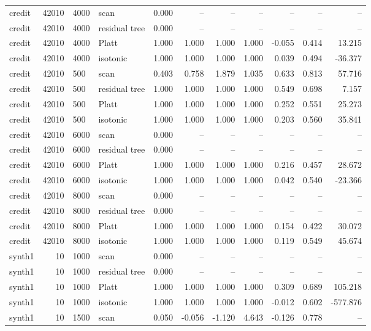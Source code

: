 \begin{tabular}{lrllrrrrrrr}
credit & 42010 & 4000 & scan & 0.000 & -- & -- & -- & -- & -- & -- \\
credit & 42010 & 4000 & residual tree & 0.000 & -- & -- & -- & -- & -- & -- \\
credit & 42010 & 4000 & Platt & 1.000 & 1.000 & 1.000 & 1.000 & -0.055 & 0.414 & 13.215 \\
credit & 42010 & 4000 & isotonic & 1.000 & 1.000 & 1.000 & 1.000 & 0.039 & 0.494 & -36.377 \\
credit & 42010 & 500 & scan & 0.403 & 0.758 & 1.879 & 1.035 & 0.633 & 0.813 & 57.716 \\
credit & 42010 & 500 & residual tree & 1.000 & 1.000 & 1.000 & 1.000 & 0.549 & 0.698 & 7.157 \\
credit & 42010 & 500 & Platt & 1.000 & 1.000 & 1.000 & 1.000 & 0.252 & 0.551 & 25.273 \\
credit & 42010 & 500 & isotonic & 1.000 & 1.000 & 1.000 & 1.000 & 0.203 & 0.560 & 35.841 \\
credit & 42010 & 6000 & scan & 0.000 & -- & -- & -- & -- & -- & -- \\
credit & 42010 & 6000 & residual tree & 0.000 & -- & -- & -- & -- & -- & -- \\
credit & 42010 & 6000 & Platt & 1.000 & 1.000 & 1.000 & 1.000 & 0.216 & 0.457 & 28.672 \\
credit & 42010 & 6000 & isotonic & 1.000 & 1.000 & 1.000 & 1.000 & 0.042 & 0.540 & -23.366 \\
credit & 42010 & 8000 & scan & 0.000 & -- & -- & -- & -- & -- & -- \\
credit & 42010 & 8000 & residual tree & 0.000 & -- & -- & -- & -- & -- & -- \\
credit & 42010 & 8000 & Platt & 1.000 & 1.000 & 1.000 & 1.000 & 0.154 & 0.422 & 30.072 \\
credit & 42010 & 8000 & isotonic & 1.000 & 1.000 & 1.000 & 1.000 & 0.119 & 0.549 & 45.674 \\
synth1 & 10 & 1000 & scan & 0.000 & -- & -- & -- & -- & -- & -- \\
synth1 & 10 & 1000 & residual tree & 0.000 & -- & -- & -- & -- & -- & -- \\
synth1 & 10 & 1000 & Platt & 1.000 & 1.000 & 1.000 & 1.000 & 0.309 & 0.689 & 105.218 \\
synth1 & 10 & 1000 & isotonic & 1.000 & 1.000 & 1.000 & 1.000 & -0.012 & 0.602 & -577.876 \\
synth1 & 10 & 1500 & scan & 0.050 & -0.056 & -1.120 & 4.643 & -0.126 & 0.778 & -- \\

\end{tabular}

